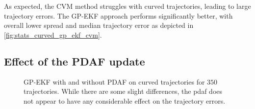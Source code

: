 As expected, the CVM method struggles with curved trajectories, leading to large trajectory errors. The GP-EKF approach performs significantly better, with overall lower spread and median trajectory error as depicted in \cref{fig:stats_curved_gp_ekf_cvm}.

\subsection{Effect of the PDAF update}
\begin{figure}
    \centering
    \caption{GP-EKF with and without PDAF on curved trajectories for $350$ trajectories. While there are some slight differences, the \acrshort{pdaf} does not appear to have any considerable effect on the trajectory errors.}
    \label{fig:stats_gp_ekf_with_or_without_pdaf}
\end{figure}

